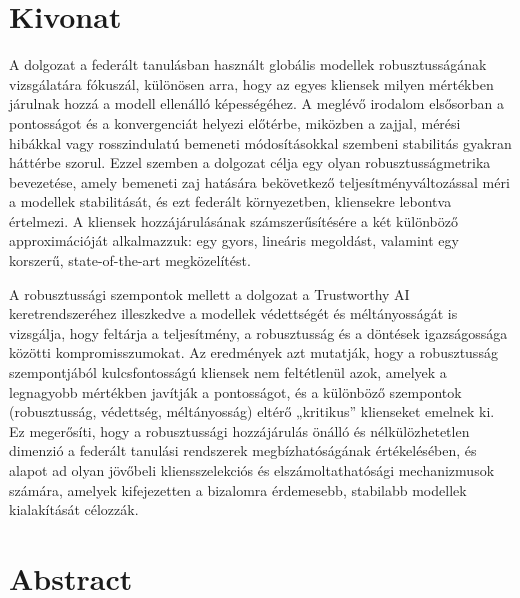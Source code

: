 \setcounter{page}{1}

\selecthungarian

\chapter*{Kivonat}
\label{chap: abstarct}
A dolgozat a federált tanulásban használt globális modellek robusztusságának vizsgálatára fókuszál, különösen arra, hogy az egyes kliensek milyen mértékben járulnak hozzá a modell ellenálló képességéhez. A meglévő irodalom elsősorban a pontosságot és a konvergenciát helyezi előtérbe, miközben a zajjal, mérési hibákkal vagy rosszindulatú bemeneti módosításokkal szembeni stabilitás gyakran háttérbe szorul. Ezzel szemben a dolgozat célja egy olyan robusztusságmetrika bevezetése, amely bemeneti zaj hatására bekövetkező teljesítményváltozással méri a modellek stabilitását, és ezt federált környezetben, kliensekre lebontva értelmezi. A kliensek hozzájárulásának számszerűsítésére a két különböző approximációját alkalmazzuk: egy gyors, lineáris megoldást, valamint egy korszerű, state-of-the-art megközelítést.

A robusztussági szempontok mellett a dolgozat a Trustworthy AI keretrendszeréhez illeszkedve a modellek védettségét és méltányosságát is vizsgálja, hogy feltárja a teljesítmény, a robusztusság és a döntések igazságossága közötti kompromisszumokat. Az eredmények azt mutatják, hogy a robusztusság szempontjából kulcsfontosságú kliensek nem feltétlenül azok, amelyek a legnagyobb mértékben javítják a pontosságot, és a különböző szempontok (robusztusság, védettség, méltányosság) eltérő „kritikus” klienseket emelnek ki. Ez megerősíti, hogy a robusztussági hozzájárulás önálló és nélkülözhetetlen dimenzió a federált tanulási rendszerek megbízhatóságának értékelésében, és alapot ad olyan jövőbeli kliensszelekciós és elszámoltathatósági mechanizmusok számára, amelyek kifejezetten a bizalomra érdemesebb, stabilabb modellek kialakítását célozzák. 


\vfill
\selectenglish


\chapter*{Abstract}

